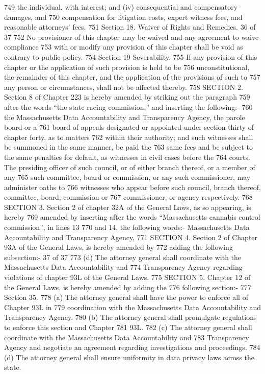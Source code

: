 749 the individual, with interest; and (iv) consequential and compensatory damages, and
750 compensation for litigation costs, expert witness fees, and reasonable attorneys’ fees.
751 Section 18. Waiver of Rights and Remedies.
36 of 37
752 No provisioner of this chapter may be waived and any agreement to waive compliance
753 with or modify any provision of this chapter shall be void as contrary to public policy.
754 Section 19 Severability.
755 If any provision of this chapter or the application of such provision is held to be
756 unconstitutional, the remainder of this chapter, and the application of the provisions of such to
757 any person or circumstances, shall not be affected thereby.
758 SECTION 2. Section 8 of Chapter 223 is hereby amended by striking out the paragraph
759 after the words “the state racing commission,” and inserting the following:-
760 the Massachusetts Data Accountability and Transparency Agency, the parole board or a
761 board of appeals designated or appointed under section thirty of chapter forty, as to matters
762 within their authority; and such witnesses shall be summoned in the same manner, be paid the
763 same fees and be subject to the same penalties for default, as witnesses in civil cases before the
764 courts. The presiding officer of such council, or of either branch thereof, or a member of any
765 such committee, board or commission, or any such commissioner, may administer oaths to
766 witnesses who appear before such council, branch thereof, committee, board, commission or
767 commissioner, or agency respectively.
768 SECTION 3. Section 2 of chapter 32A of the General Laws, as so appearing, is hereby
769 amended by inserting after the words “Massachusetts cannabis control commission”, in lines 13
770 and 14, the following words:- Massachusetts Data Accountability and Transparency Agency,
771 SECTION 4. Section 2 of Chapter 93A of the General Laws, is hereby amended by
772 adding the following subsection:-
37 of 37
773 (d) The attorney general shall coordinate with the Massachusetts Data Accountability and
774 Transparency Agency regarding violations of chapter 93L of the General Laws.
775 SECTION 5. Chapter 12 of the General Laws, is hereby amended by adding the
776 following section:-
777 Section 35.
778 (a) The attorney general shall have the power to enforce all of Chapter 93L in
779 coordination with the Massachusetts Data Accountability and Transparency Agency.
780 (b) The attorney general shall promulgate regulations to enforce this section and Chapter
781 93L.
782 (c) The attorney general shall coordinate with the Massachusetts Data Accountability and
783 Transparency Agency and negotiate an agreement regarding investigations and proceedings.
784 (d) The attorney general shall ensure uniformity in data privacy laws across the state.